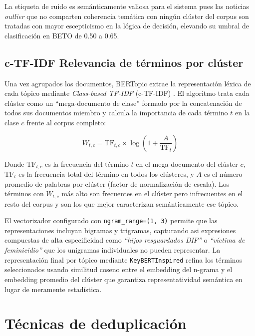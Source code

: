 La etiqueta de ruido es semánticamente valiosa para el sistema pues las noticias
\textit{outlier} que no comparten coherencia temática con ningún clúster del corpus
son tratadas con mayor escepticismo en la lógica de decisión, elevando su umbral de
clasificación en BETO de 0.50 a 0.65.


\subsection{c-TF-IDF Relevancia de términos por clúster}
\label{subsec:mt_ctfidf}


Una vez agrupados los documentos, BERTopic extrae la representación léxica de cada
tópico mediante \textit{Class-based TF-IDF} (c-TF-IDF) \cite{grootendorst2022bertopic}.
El algoritmo trata cada clúster como un ``mega-documento de clase'' formado por la
concatenación de todos sus documentos miembro y calcula la importancia de cada
término $t$ en la clase $c$ frente al corpus completo:

\begin{equation}
    W_{t,c} = \text{TF}_{t,c} \times \log\!\left(1 + \frac{A}{\text{TF}_t}\right)
\end{equation}

Donde $\text{TF}_{t,c}$ es la frecuencia del término $t$ en el mega-documento del
clúster $c$, $\text{TF}_t$ es la frecuencia total del término en todos los clústeres,
y $A$ es el número promedio de palabras por clúster (factor de normalización de
escala). Los términos con $W_{t,c}$ más alto son frecuentes en el clúster pero
infrecuentes en el resto del corpus y son los que mejor caracterizan semánticamente
ese tópico.
 
El vectorizador configurado con \texttt{ngram\_range=(1, 3)} permite que las
representaciones incluyan bigramas y trigramas, capturando asi expresiones compuestas
de alta especificidad como \textit{``hijos resguardados DIF''} o
\textit{``víctima de feminicidio''} que los unigramas individuales no pueden
representar. La representación final por tópico mediante \texttt{KeyBERTInspired}
refina los términos seleccionados usando similitud coseno entre el embedding del
n-grama y el embedding promedio del clúster que garantiza representatividad
semántica en lugar de meramente estadística.


\section{Técnicas de deduplicación}
\label{sec:mt_deduplicacion}


